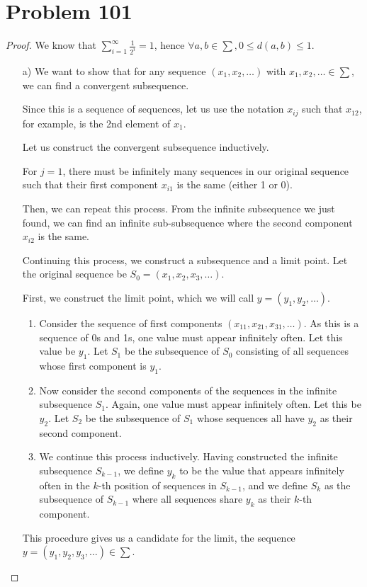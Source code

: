 \documentclass[11pt]{article}
\renewcommand{\_}[1]{\underline{ #1 }}
\theoremstyle{definition}
\numberwithin{equation}{subsection}
\begin{document}
\section*{Problem 101}
\begin{proof}
We know that $\displaystyle \sum_{i=1}^\infty \frac{1}{2^i} = 1$, hence $\forall a,b \in \sum, 0\leq d(a,b) \leq 1$. 


\begin{enumerate}
    \item[a)] We want to show that for any sequence $(x_1,x_2,\dots)$ with $x_1, x_2, \dots \in \sum$, we can find a convergent subsequence.

Since this is a sequence of sequences, let us use the notation $x_{ij}$ such that $x_{12}$, for example, is the 2nd element of $x_1$.

Let us construct the convergent subsequence inductively.

For $j=1$, there must be infinitely many sequences in our original sequence such that their first component $x_{i1}$ is the same (either 1 or 0).

Then, we can repeat this process. From the infinite subsequence we just found, we can find an infinite sub-subsequence where the second component $x_{i2}$ is the same.

Continuing this process, we construct a subsequence and a limit point. Let the original sequence be $S_0 = (x_1, x_2, x_3, \dots)$.

First, we construct the limit point, which we will call $y = (y_1, y_2, \dots)$.
\begin{enumerate}
    \item Consider the sequence of first components $(x_{11}, x_{21}, x_{31}, \dots)$. As this is a sequence of 0s and 1s, one value must appear infinitely often. Let this value be $y_1$. Let $S_1$ be the subsequence of $S_0$ consisting of all sequences whose first component is $y_1$.
    \item Now consider the second components of the sequences in the infinite subsequence $S_1$. Again, one value must appear infinitely often. Let this be $y_2$. Let $S_2$ be the subsequence of $S_1$ whose sequences all have $y_2$ as their second component.
    \item We continue this process inductively. Having constructed the infinite subsequence $S_{k-1}$, we define $y_k$ to be the value that appears infinitely often in the $k$-th position of sequences in $S_{k-1}$, and we define $S_k$ as the subsequence of $S_{k-1}$ where all sequences share $y_k$ as their $k$-th component.
\end{enumerate}
This procedure gives us a candidate for the limit, the sequence $y = (y_1, y_2, y_3, \dots) \in \sum$.


\end{enumerate}
\end{proof}
\end{document}

